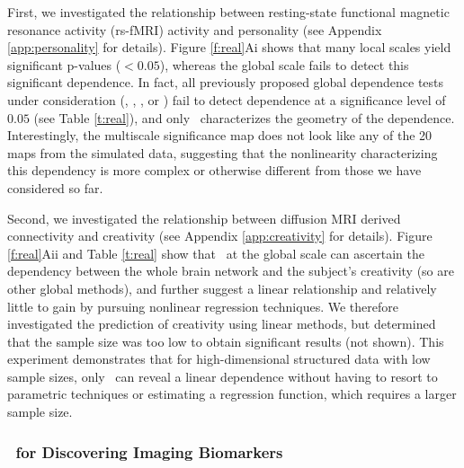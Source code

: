 \documentclass[11pt]{extarticle}
\begin{document}
First, we investigated the relationship between resting-state functional  magnetic resonance activity (rs-fMRI) activity and personality \cite{AdelsteinEtAl2011} (see Appendix \ref{app:personality} for details).
Figure \ref{f:real}{\color{magenta}Ai} shows that many local scales yield significant p-values ($< 0.05$), whereas the global scale fails to detect this significant dependence. In fact, all previously proposed global dependence tests under consideration (\Mantel, \Dcorr, \Mcorr, or \Hhg) fail to detect dependence at a significance level of $0.05$ (see Table \ref{t:real}), and only \Mgc~characterizes the geometry of the dependence.
Interestingly, the multiscale significance map does not look like any of the 20 maps from the simulated data, suggesting that the nonlinearity characterizing this dependency is more complex or otherwise different from those we have considered so far.

Second, we investigated the relationship between diffusion MRI derived connectivity and creativity \cite{Jung2009}  (see Appendix \ref{app:creativity} for details).
Figure \ref{f:real}{\color{magenta}Aii} and Table \ref{t:real} show that \Mgc~at the global scale can ascertain the dependency between the whole brain network and the subject's creativity (so are other global methods),
and further suggest a linear relationship and relatively little to gain by pursuing nonlinear regression techniques.
We therefore investigated the prediction of creativity using linear methods, but determined that the sample size was too low to obtain significant results (not shown).
This experiment demonstrates that for high-dimensional structured data with low sample sizes, only \Mgc~can  reveal a  linear dependence without having to resort to parametric techniques or  estimating a regression function, which requires a larger sample size.

\subsubsection*{\Mgc~for Discovering Imaging Biomarkers}
\end{document}
